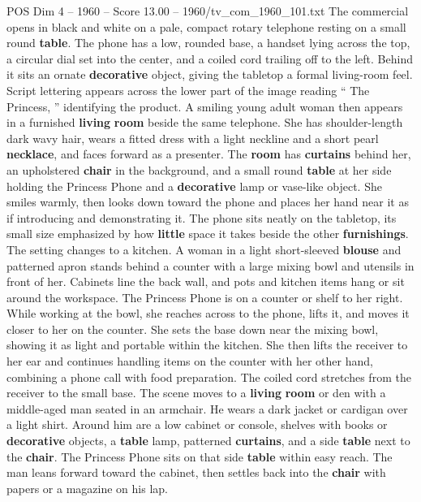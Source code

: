 \begin{textsample}{POS Dim 4 – 1960 – Score 13.00 – 1960/tv\_com\_1960\_101.txt}  \label{ex:f4_pos_068}
The commercial opens in black and white on a pale, compact rotary telephone resting on a small round \textbf{table}.
The phone has a low, rounded base, a handset lying across the top, a circular dial set into the center, and a coiled cord trailing off to the left.
Behind it sits an ornate \textbf{decorative} object, giving the tabletop a formal living-room feel.
Script lettering appears across the lower part of the image reading “ The Princess, ” identifying the product.
A smiling young adult woman then appears in a furnished \textbf{living} \textbf{room} beside the same telephone.
She has shoulder-length dark wavy hair, wears a fitted dress with a light neckline and a short pearl \textbf{necklace}, and faces forward as a presenter.
The \textbf{room} has \textbf{curtains} behind her, an upholstered \textbf{chair} in the background, and a small round \textbf{table} at her side holding the Princess Phone and a \textbf{decorative} lamp or vase-like object.
She smiles warmly, then looks down toward the phone and places her hand near it as if introducing and demonstrating it.
The phone sits neatly on the tabletop, its small size emphasized by how \textbf{little} space it takes beside the other \textbf{furnishings}.
The setting changes to a kitchen.
A woman in a light short-sleeved \textbf{blouse} and patterned apron stands behind a counter with a large mixing bowl and utensils in front of her.
Cabinets line the back wall, and pots and kitchen items hang or sit around the workspace.
The Princess Phone is on a counter or shelf to her right.
While working at the bowl, she reaches across to the phone, lifts it, and moves it closer to her on the counter.
She sets the base down near the mixing bowl, showing it as light and portable within the kitchen.
She then lifts the receiver to her ear and continues handling items on the counter with her other hand, combining a phone call with food preparation.
The coiled cord stretches from the receiver to the small base.
The scene moves to a \textbf{living} \textbf{room} or den with a middle-aged man seated in an armchair.
He wears a dark jacket or cardigan over a light shirt.
Around him are a low cabinet or console, shelves with books or \textbf{decorative} objects, a \textbf{table} lamp, patterned \textbf{curtains}, and a side \textbf{table} next to the \textbf{chair}.
The Princess Phone sits on that side \textbf{table} within easy reach.
The man leans forward toward the cabinet, then settles back into the \textbf{chair} with papers or a magazine on his lap.

\end{textsample}
